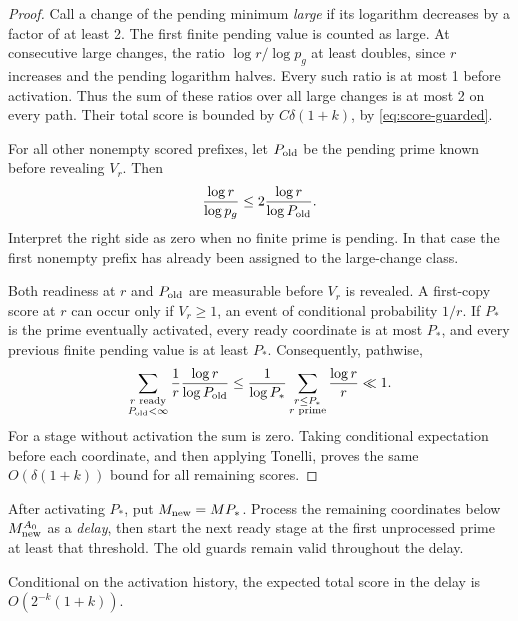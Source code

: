 \begin{proof}
Call a change of the pending minimum \emph{large} if its
logarithm decreases by a factor of at least 2. The first
finite pending value is counted as large.
At consecutive large changes, the ratio
\(\log r/\log p_g\) at least doubles, since \(r\)
increases and the pending logarithm halves.
Every such ratio is at most 1 before activation.
Thus the sum of these ratios over all large changes
is at most 2 on every path. Their total score is bounded
by \(C\delta(1+k)\), by \eqref{eq:score-guarded}.

For all other nonempty scored prefixes, let \(P_{\rm old}\)
be the pending prime known before revealing \(V_r\).
Then
\[
 \frac{\log r}{\log p_g}
       \le2\frac{\log r}{\log P_{\rm old}}.
\]
Interpret the right side as zero when no finite prime
is pending. In that case the first nonempty prefix
has already been assigned to the large-change class.

Both readiness at \(r\) and \(P_{\rm old}\) are measurable
before \(V_r\) is revealed. A first-copy score at \(r\)
can occur only if \(V_r\ge1\), an event of conditional
probability \(1/r\).
If \(P_*\) is the prime eventually activated, every ready
coordinate is at most \(P_*\), and every previous finite
pending value is at least \(P_*\). Consequently, pathwise,
\begin{equation}\label{eq:predictable-budget}
 \sum_{\substack{r\text{ ready}\\P_{\rm old}<\infty}}
       \frac1r\frac{\log r}{\log P_{\rm old}}
 \le\frac1{\log P_*}
       \sum_{\substack{r\le P_*\\r\text{ prime}}}
                         \frac{\log r}{r}
 \ll1.
\end{equation}
For a stage without activation the sum is zero.
Taking conditional expectation before each coordinate,
and then applying Tonelli, proves the same
\(O(\delta(1+k))\) bound for all remaining scores.
\end{proof}

After activating \(P_*\), put \(M_{\rm new}=MP_*\).
Process the remaining coordinates below \(M_{\rm new}^{A_0}\)
as a \emph{delay}, then start the next ready stage at the
first unprocessed prime at least that threshold.
The old guards remain valid throughout the delay.

\begin{lemma}\label{lem:delay-cost}
Conditional on the activation history, the expected
total score in the delay is \(O(2^{-k}(1+k))\).
\end{lemma}

